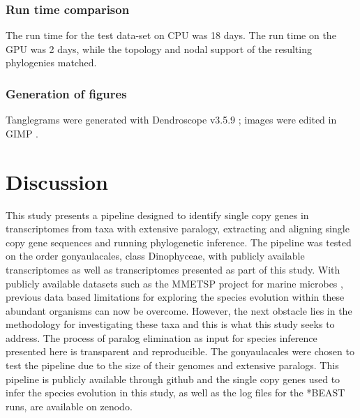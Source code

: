 \documentclass[12pt]{article}
\begin{document}
\subsubsection*{Run time comparison}
The run time for the test data-set on CPU was 18 days. The run time on the GPU was 2 days, while the topology and nodal support of the resulting phylogenies matched.
\subsubsection*{Generation of figures}
Tanglegrams were generated with Dendroscope v3.5.9 \cite{huson2007dendroscope}; images were edited in GIMP \cite{gimp}.
\newpage
\section{Discussion}
This study presents a pipeline designed to identify single copy genes in transcriptomes from taxa with extensive paralogy, extracting and aligning single copy gene sequences and running phylogenetic inference. 
The pipeline was tested on the order gonyaulacales, class Dinophyceae, with publicly available transcriptomes as well as transcriptomes presented as part of this study. 
With publicly available datasets such as the MMETSP project for marine microbes \cite{keeling2014marine}, previous data based limitations for exploring the species evolution within these abundant organisms can now be overcome. 
However, the next obstacle lies in the methodology for investigating these taxa and this is what this study seeks to address. 
The process of paralog elimination as input for species inference presented here is transparent and reproducible. 
The gonyaulacales were chosen to test the pipeline due to the size of their genomes and extensive paralogs.
This pipeline is publicly available through github and the single copy genes used to infer the species evolution in this study, as well as the log files for the *BEAST runs, are available on zenodo.
\end{document}
